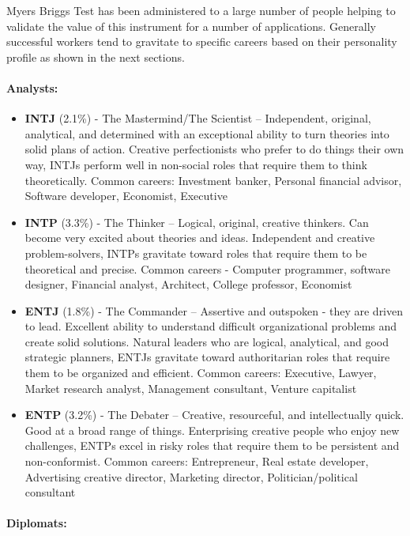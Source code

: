 \documentclass[]{book}
\let\oldparagraph\paragraph
\renewcommand{\paragraph}[1]{\oldparagraph{#1}\mbox{}}
\begin{document}
Myers Briggs Test has been administered to a large number of people helping to validate the value of this instrument for a number of applications. Generally successful workers tend to gravitate to specific careers based on their personality profile as shown in the next sections. \citep{Tieger2014}

\hypertarget{analysts}{%
\paragraph{Analysts:}\label{analysts}}

\begin{itemize}
\item
  \textbf{INTJ} (2.1\%) - The Mastermind/The Scientist -- Independent, original, analytical, and determined with an exceptional ability to turn theories into solid plans of action. Creative perfectionists who prefer to do things their own way, INTJs perform well in non-social roles that require them to think theoretically. Common careers: Investment banker, Personal financial advisor, Software developer, Economist, Executive
\item
  \textbf{INTP} (3.3\%) - The Thinker -- Logical, original, creative thinkers. Can become very excited about theories and ideas. Independent and creative problem-solvers, INTPs gravitate toward roles that require them to be theoretical and precise. Common careers - Computer programmer, software designer, Financial analyst, Architect, College professor, Economist
\item
  \textbf{ENTJ} (1.8\%) - The Commander -- Assertive and outspoken - they are driven to lead. Excellent ability to understand difficult organizational problems and create solid solutions. Natural leaders who are logical, analytical, and good strategic planners, ENTJs gravitate toward authoritarian roles that require them to be organized and efficient. Common careers: Executive, Lawyer, Market research analyst, Management consultant, Venture capitalist
\item
  \textbf{ENTP} (3.2\%) - The Debater -- Creative, resourceful, and intellectually quick. Good at a broad range of things. Enterprising creative people who enjoy new challenges, ENTPs excel in risky roles that require them to be persistent and non-conformist. Common careers: Entrepreneur, Real estate developer, Advertising creative director, Marketing director, Politician/political consultant
\end{itemize}

\hypertarget{diplomats}{%
\paragraph{Diplomats:}\label{diplomats}}
\end{document}
